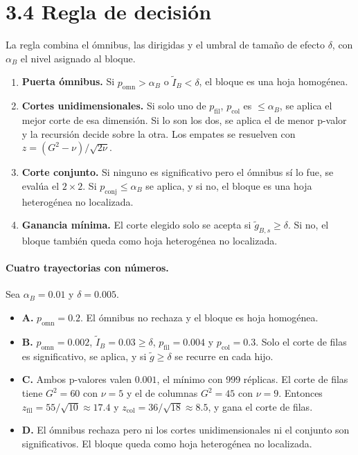 \documentclass[11pt,a4paper]{article}
\begin{document}
\section{3.4 Regla de decisión}

La regla combina el ómnibus, las dirigidas y el umbral de tamaño de efecto $\delta$,
con $\alpha_B$ el nivel asignado al bloque.
\begin{enumerate}
\item \textbf{Puerta ómnibus.} Si $p_{\mathrm{omn}}>\alpha_B$ o $\tilde I_B<\delta$,
el bloque es una hoja homogénea.
\item \textbf{Cortes unidimensionales.} Si solo uno de $p_{\mathrm{fil}}$,
$p_{\mathrm{col}}$ es $\le\alpha_B$, se aplica el mejor corte de esa dimensión. Si lo
son los dos, se aplica el de menor p-valor y la recursión decide sobre la otra. Los
empates se resuelven con $z=(G^2-\nu)/\sqrt{2\nu}$.
\item \textbf{Corte conjunto.} Si ninguno es significativo pero el ómnibus sí lo fue,
se evalúa el $2\times2$. Si $p_{\mathrm{conj}}\le\alpha_B$ se aplica, y si no, el
bloque es una hoja heterogénea no localizada.
\item \textbf{Ganancia mínima.} El corte elegido solo se acepta si
$\tilde g_{B,s}\ge\delta$. Si no, el bloque también queda como hoja heterogénea no
localizada.
\end{enumerate}

\paragraph{Cuatro trayectorias con números.} Sea $\alpha_B=0.01$ y $\delta=0.005$.
\begin{itemize}
\item \textbf{A.} $p_{\mathrm{omn}}=0.2$. El ómnibus no rechaza y el bloque es hoja
homogénea.
\item \textbf{B.} $p_{\mathrm{omn}}=0.002$, $\tilde I_B=0.03\ge\delta$,
$p_{\mathrm{fil}}=0.004$ y $p_{\mathrm{col}}=0.3$. Solo el corte de filas es
significativo, se aplica, y si $\tilde g\ge\delta$ se recurre en cada hijo.
\item \textbf{C.} Ambos p-valores valen $0.001$, el mínimo con 999 réplicas. El
corte de filas tiene $G^2=60$ con $\nu=5$ y el de columnas $G^2=45$ con $\nu=9$.
Entonces $z_{\mathrm{fil}}=55/\sqrt{10}\approx17.4$ y
$z_{\mathrm{col}}=36/\sqrt{18}\approx8.5$, y gana el corte de filas.
\item \textbf{D.} El ómnibus rechaza pero ni los cortes unidimensionales ni el
conjunto son significativos. El bloque queda como hoja heterogénea no localizada.
\end{itemize}
\end{document}
